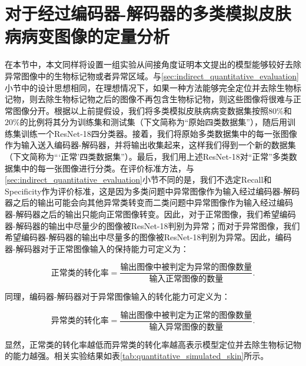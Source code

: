 \section{对于经过编码器-解码器的多类模拟皮肤病病变图像的定量分析}
在本节中，本文同样将设置一组实验从间接角度证明本文提出的模型能够较好去除异常图像中的生物标记物或者异常区域。与\ref{sec:indirect_quantitative_evaluation}小节中的设计思想相同，在理想情况下，如果一种方法能够完全定位并去除生物标记物，则去除生物标记物之后的图像不再包含生物标记物，则这些图像将很难与正常图像分开。根据以上前提假设，我们将多类模拟皮肤病病变数据集按照$80\%$和$20\%$的比例将其分为训练集和测试集（下文简称为“原始四类数据集”），随后用训练集训练一个ResNet-18四分类器。接着，我们将原始多类数据集中的每一张图像作为输入送入编码器-解码器，并将输出收集起来，这样我们得到一个新的数据集（下文简称为“‘正常’四类数据集”）。最后，我们用上述ResNet-18对“正常”多类数据集中的每一张图像进行分类。在评价标准方法，与\ref{sec:indirect_quantitative_evaluation}小节不同的是，我们不选定Recall和Specificity作为评价标准，这是因为多类问题中异常图像作为输入经过编码器-解码器之后的输出可能会向其他异常类转变而二类问题中异常图像作为输入经过编码器-解码器之后的输出只能向正常图像转变。因此，对于正常图像，我们希望编码器-解码器的输出中尽量少的图像被ResNet-18判别为异常；而对于异常图像，我们希望编码器-解码器的输出中尽量多的图像被ResNet-18判别为异常。因此，编码器-解码器对于正常图像输入的保持能力可定义为：

\begin{equation}\label{equ:normal_imgs_kep_rate}
\text{正常类的转化率}=\frac{\text{输出图像中被判定为异常的图像数量}}{\text{输入正常图像的数量}}.
\end{equation}

\noindent 同理，编码器-解码器对于异常图像输入的转化能力可定义为：

\begin{equation}\label{equ:lesion_imgs_converted_rate}
\text{异常类的转化率}=\frac{\text{输出图像中被判定为正常的图像数量}}{\text{输入异常图像的数量}}.
\end{equation}

\noindent 显然，正常类的转化率越低而异常类的转化率越高表示模型定位并去除生物标记物的能力越强。相关实验结果如表\ref{tab:quantitative_simulated_skin}所示。

